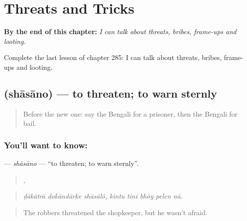 
\chapter{Threats and Tricks}
\label{ch:bn-threats-and-tricks}

\begin{chapteropening}
\textbf{By the end of this chapter:} \emph{I can talk about threats, bribes, frame-ups and looting.}

Complete the last lesson of chapter 285: I can talk about threats, bribes, frame-ups and looting.
\end{chapteropening}

\section[\texorpdfstring{\bn{শাসানো} (shāsāno)}{শাসানো (shāsāno)}]{ (shāsāno) — to threaten; to warn sternly}

\label{lesson:BN-C285-shasano}



\begin{quote}
Before the new one: say the Bengali for a prisoner, then the Bengali for bail.
\end{quote}

\subsection*{You'll want to know: }
\textbf{} — \emph{shāsāno} — \textquotedblleft{}to threaten; to warn sternly\textquotedblright{}.

\begin{quote}
  ,     
\end{quote}

\begin{quote}
\emph{ḍākātrā dokāndārke shāsālô, kintu tini bhôy pelen nā.}
\end{quote}

\begin{quote}
The robbers threatened the shopkeeper, but he wasn't afraid.
\end{quote}

